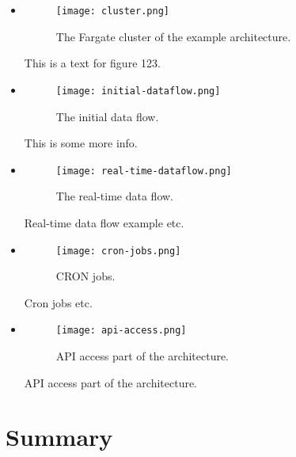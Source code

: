\begin{itemize}
\item \begin{figure}[!ht]
  \centering
  \texttt{[image: cluster.png]}
  \caption{The Fargate cluster of the example architecture.}
  \label{fig:cluster}
\end{figure}

This is a text for figure 123.

\item  \begin{figure}[!ht]
  \centering
  \texttt{[image: initial-dataflow.png]}
  \caption{The initial data flow.}
  \label{fig:initial-flow}
\end{figure}

This is some more info.

\item  \begin{figure}[!ht]
  \centering
  \texttt{[image: real-time-dataflow.png]}
  \caption{The real-time data flow.}
  \label{fig:realtime-flow}
\end{figure}

Real-time data flow example etc.

\item \begin{figure}[!ht]
  \centering
  \texttt{[image: cron-jobs.png]}
  \caption{CRON jobs.}
  \label{fig:cron}
\end{figure}

Cron jobs etc.

\item \begin{figure}[!ht]
  \centering
  \texttt{[image: api-access.png]}
  \caption{API access part of the architecture.}
  \label{fig:api-access}
\end{figure}

API access part of the architecture.

\end{itemize}


\section{Summary}
\label{chapter5-summary}

